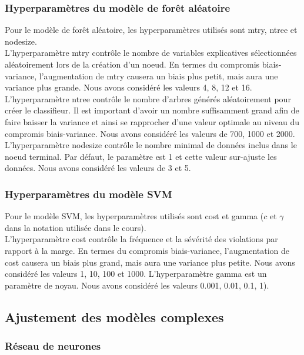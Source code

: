 \subsubsection{Hyperparamètres du modèle de forêt aléatoire}
Pour le modèle de forêt aléatoire, les hyperparamètres utilisés sont mtry, ntree et nodesize.\\
L'hyperparamètre mtry contrôle le nombre de variables explicatives sélectionnées aléatoirement lors de la création d'un noeud. En termes du compromis biais-variance, l'augmentation de mtry causera un biais plus petit, mais aura une variance plus grande.  Nous avons considéré les valeurs 4, 8, 12 et 16.\\
L'hyperparamètre ntree contrôle le nombre d'arbres générés aléatoirement pour créer le classifieur. Il est important d'avoir un nombre suffisamment grand afin de faire baisser la variance et ainsi se rapprocher d'une valeur optimale au niveau du compromis biais-variance. Nous avons considéré les valeurs de 700, 1000 et 2000.
L'hyperparamètre nodesize contrôle le nombre minimal de données inclus dans le noeud terminal. Par défaut, le paramètre est 1 et cette valeur sur-ajuste les données. Nous avons considéré les valeurs de 3 et 5.

\subsubsection{Hyperparamètres du modèle SVM}
Pour le modèle SVM, les hyperparamètres utilisés sont cost et gamma ($c$ et $\gamma$ dans la notation utilisée dans le cours).\\
L'hyperparamètre cost contrôle la fréquence et la sévérité des violations par rapport à la marge. En termes du compromis biais-variance, l'augmentation de cost causera un biais plus grand, mais aura une variance plus petite. Nous avons considéré les valeurs 1, 10, 100 et 1000. L'hyperparamètre gamma est un paramètre de noyau. Nous avons considéré les valeurs 0.001, 0.01, 0.1, 1).\\

\subsection{Ajustement des modèles complexes}

\subsubsection{Réseau de neurones}


